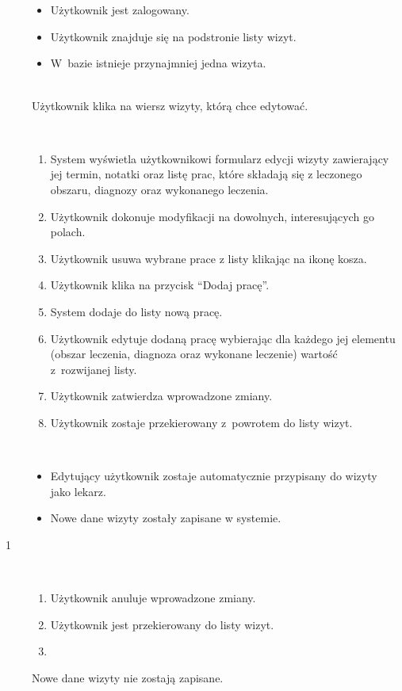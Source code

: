 \documentclass[11pt]{aghdpl}
\begin{document}
	\begin{description}
		\item[\useCaseAktor] \hfill \\
			\useCaseUzytkownik
		\item[\useCaseWarPocz] \hfill \\
			\begin{itemize}
				\item Użytkownik jest zalogowany.
				\item Użytkownik znajduje się na podstronie listy wizyt.
				\item W~bazie istnieje przynajmniej jedna wizyta.
			\end{itemize}
		\item[\useCaseZdarzInicj] \hfill \\
			Użytkownik klika na wiersz wizyty, którą chce edytować.
		\item[\useCaseScenBaz] \hfill \\ 
			\begin{enumerate}
				\item System wyświetla użytkownikowi formularz edycji wizyty zawierający jej termin, notatki oraz listę prac, które składają się z leczonego obszaru, diagnozy oraz wykonanego leczenia.
				\item Użytkownik dokonuje modyfikacji na dowolnych, interesujących go polach.
				\item Użytkownik usuwa wybrane prace z listy klikając na ikonę kosza.
				\item Użytkownik klika na przycisk ``Dodaj pracę''.
				\item System dodaje do listy nową pracę.
				\item Użytkownik edytuje dodaną pracę wybierając dla każdego jej elementu (obszar leczenia, diagnoza oraz wykonane leczenie) wartość z~rozwijanej listy.
				\item Użytkownik zatwierdza wprowadzone zmiany.
				\item Użytkownik zostaje przekierowany z~powrotem do listy wizyt.
			\end{enumerate}
		\item[\useCaseWarKonc] \hfill \\ 
			\begin{itemize}
				\item Edytujący użytkownik zostaje automatycznie przypisany do wizyty jako lekarz.
				\item Nowe dane wizyty zostały zapisane w systemie.
			\end{itemize}
			
		\item[\useCaseWyjatek~1] \hfill \\
			\begin{enumerate}[label=7a\arabic*.]
				\item Użytkownik anuluje wprowadzone zmiany.
				\item Użytkownik jest przekierowany do listy wizyt.
				\item \useCaseEnd
			\end{enumerate}
			Nowe dane wizyty nie zostają zapisane.
	\end{description}
	
\end{document}
